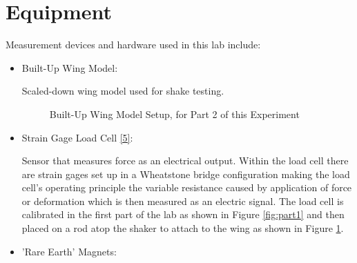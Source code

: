 \documentclass{article}
\begin{document}
\section{Equipment}
Measurement devices and hardware used in this lab include:
\begin{itemize}

\item Built-Up Wing Model: 
\vspace{1mm}

Scaled-down wing model used for shake testing. 

\begin{figure}[H]
    \centering
    \caption{Built-Up Wing Model Setup, for Part 2 of this Experiment}
    \label{fig:wingsetup}
\end{figure}
\vspace{2.5mm}

\item Strain Gage Load Cell \hyperlink{datasheets}{[5]}:
\vspace{1mm}

Sensor that measures force as an electrical output. Within the load cell there are strain gages set up in a Wheatstone bridge configuration making the load cell's operating principle the variable resistance caused by application of force or deformation which is then measured as an electric signal. The load cell is calibrated in the first part of the lab as shown in Figure \ref{fig:part1} and then placed on a rod atop the shaker to attach to the wing as shown in Figure \ref{fig:wingsetup}.
\vspace{2.5mm}

\item 'Rare Earth' Magnets:
\vspace{1mm}


\end{itemize}
\end{document}
